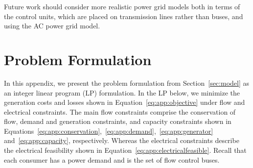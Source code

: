 \documentclass{article}[11pt,a4paper]
\begin{document}
Future work should consider more realistic power grid models both in
terms of the control units, which are placed on transmission lines
rather than buses, and using the AC power grid model.

 
\clearpage
\appendix
\section{Problem Formulation} \label{app:lp}
In this appendix, we present the problem formulation from Section~\ref{sec:model} as an integer linear program (LP) formulation. In the LP below, we minimize the generation costs  and losses  shown in Equation~\ref{eq:app:objective} under flow and electrical constraints. The main flow constraints comprise the conservation of flow, demand and generation constraints, and capacity constraints shown in Equations~\ref{eq:app:conservation},~\ref{eq:app:demand},~\ref{eq:app:generator} and~\ref{eq:app:capacity}, respectively. Whereas the electrical constraints describe the electrical feasibility shown in Equation~\ref{eq:app:electricalfeasible}. Recall that each consumer  has a power demand  and  is the set of flow control buses.
\begin{figure*}[b!]
\centering

\end{figure*}
\end{document}
